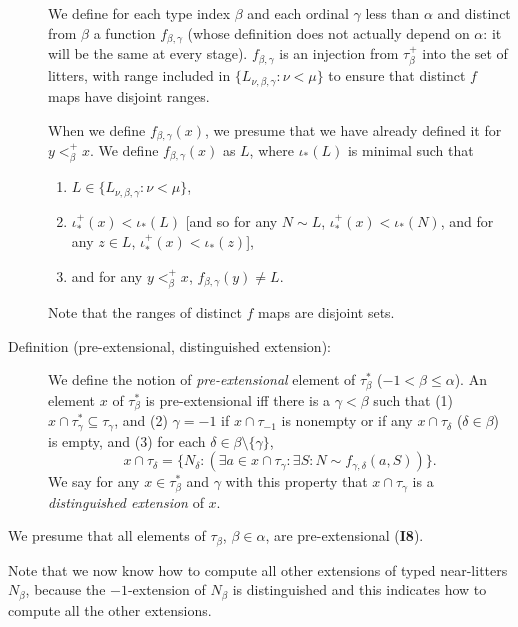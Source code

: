 \documentclass[112pt]{article}
\begin{document}
\begin{description}
We define for each type index $\beta$ and each ordinal $\gamma$ less than $\alpha$ and distinct from $\beta$ a function $f_{\beta,\gamma}$ (whose definition does not actually depend on $\alpha$:  it will be the same at every stage).  $f_{\beta,\gamma}$ is an injection from $\tau_\beta^+$ into the set of litters, with range included in  $\{L_{\nu,\beta,\gamma}:\nu < \mu\}$ to ensure that distinct $f$ maps have disjoint ranges.


 When we define $f_{\beta,\gamma}(x)$, we presume that we have already defined it for $y <^+_\beta x$.
We define $f_{\beta,\gamma}(x)$ as $L$, where $\iota_*(L)$ is minimal such that 

\begin{enumerate}
\item $L \in  \{L_{\nu,\beta,\gamma}:\nu < \mu\}$, 

\item  $\iota^+_*(x) <\iota_*(L)$ [and so for any $N \sim L$, $\iota^+_*(x) <\iota_*(N)$, and for any $z \in L$, $\iota^+_*(x) < \iota_*(z)$], 

\item and for any $y<_\beta^+ x$, $f_{\beta,\gamma}(y) \neq L$.

\end{enumerate}

Note that the ranges of distinct $f$ maps are disjoint sets.



\item[Definition (pre-extensional, distinguished extension):]  We define the notion of {\em pre-extensional\/} element of $\tau^*_\beta$ ($-1 <\beta \leq \alpha$).   An element $x$ of $\tau^*_\beta$ is pre-extensional iff there is a $\gamma<\beta$ such that (1) $x \cap \tau^*_\gamma \subseteq \tau_\gamma$, and (2) $\gamma=-1$ if
$x \cap \tau_{-1}$ is nonempty or if any $x \cap \tau_\delta$ ($\delta \in \beta$) is empty,  and (3) for each $\delta \in \beta \setminus \{\gamma\}$, $$x \cap \tau_\delta= \{N_\delta:(\exists a \in x\cap \tau_\gamma:\exists S:N \sim f_{\gamma,\delta}(a,S))\}.$$  We say for any $x \in \tau^*_\beta$ and $\gamma$ with this property that $x \cap \tau_\gamma$ is a {\em distinguished extension\/} of $x$.

\end{description}

We presume that all elements of $\tau_\beta$, $\beta\in \alpha$, are pre-extensional ({\bf I8}). 

 

Note that we now know how to compute all other extensions of typed near-litters $N_\beta$, because the $-1$-extension of $N_\beta$ is distinguished and this indicates how to compute all the other extensions.
\end{document}

